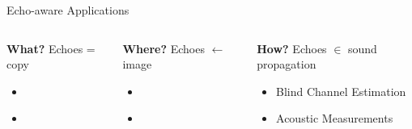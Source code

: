 \begin{frame}[t]{Echo-aware Applications \hfill\faBook}
    \pause[5]
    \begin{columns}[T,onlytextwidth]
        \begin{block}{\textbf{What?}}
            \small
            Echoes = copy

            \vspace{-2mm}
            \begin{itemize}
                \item {}
                \\{\footnotesize\cite{leglaive2016multichannel}}
                \item {}
                \\{\footnotesize\cite{flanagan1993spatially,dokmanic2015raking,kowalczyk2019raking}}
            \end{itemize}
        \end{block}
        \pause[6]
        \begin{block}{\textbf{Where?}}
            \small
            Echoes $\gets$ image

            \vspace{-2mm}
            \begin{itemize}
                \item {}
                \\{\footnotesize\cite{ribeiro2010turning,jensen2019method}}
                \item {}
                \\{\footnotesize\cite{antonacci2012inference,crocco2017uncalibrated}}
            \end{itemize}
        \end{block}
        \pause[7]
        \begin{block}{\textbf{How?}}
            \small
            Echoes $\in$ sound propagation

            \vspace{-2mm}
            \begin{itemize}
                \item Blind Channel Estimation
                \\{\footnotesize\cite{lin2007blind,crocco2017uncalibrated}}
                \item Acoustic Measurements
                \\{\footnotesize\cite{eaton2015ace,kuttruff2016room}}
            \end{itemize}
        \end{block}
    \end{columns}


\end{frame}
